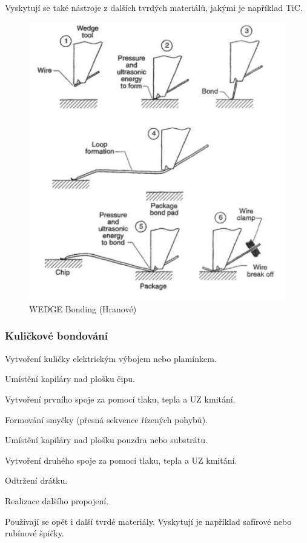 Vyskytují se také nástroje z dalších tvrdých materiálů, jakými je například TiC.
\begin{figure}[h]
   \begin{center}
     \includegraphics[scale=0.6]{images/Hrana.png}
   \end{center}
   \caption{WEDGE Bonding (Hranové)}
\end{figure}

\subsubsection{Kuličkové bondování}
Vytvoření kuličky elektrickým výbojem nebo plamínkem.

Umístění kapiláry nad plošku čipu.

Vytvoření prvního spoje za pomocí tlaku, tepla a UZ kmitání.

Formování smyčky (přesná sekvence řízených pohybů).

Umístění kapiláry nad plošku pouzdra nebo substrátu.

Vytvoření druhého spoje za pomocí tlaku, tepla a UZ kmitání.

Odtržení drátku.

Realizace dalšího propojení.

Používají se opět i další tvrdé materiály. Vyskytují je například safírové nebo rubínové špičky.

